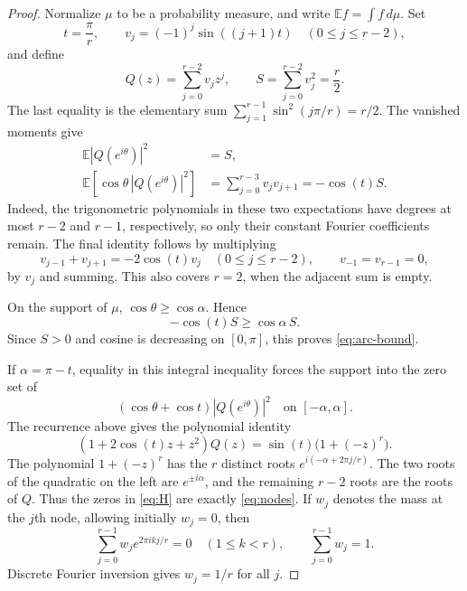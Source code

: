 \documentclass[11pt]{article}
\theoremstyle{definition}
\theoremstyle{remark}
\numberwithin{equation}{section}
\newcommand{\E}{\mathbb E}
\begin{document}
\begin{proof}
Normalize $\mu$ to be a probability measure, and write
$\E f=\int f\,d\mu$. Set
\begin{equation}\label{eq:sine-vector}
 t=\frac\pi r,\qquad
 v_j=(-1)^j\sin((j+1)t)\quad(0\le j\le r-2),
\end{equation}
and define
\begin{equation}\label{eq:Q}
 Q(z)=\sum_{j=0}^{r-2}v_jz^j,\qquad
 S=\sum_{j=0}^{r-2}v_j^2=\frac r2.
\end{equation}
The last equality is the elementary sum
$\sum_{j=1}^{r-1}\sin^2(j\pi/r)=r/2$.
The vanished moments give
\begin{align}
 \E|Q(e^{i\theta})|^2&=S,\label{eq:norm}\\
 \E\!\left[\cos\theta\,|Q(e^{i\theta})|^2\right]
 &=\sum_{j=0}^{r-3}v_jv_{j+1}
 =-\cos(t)S.\label{eq:cosine}
\end{align}
Indeed, the trigonometric polynomials in these two expectations have
degrees at most $r-2$ and $r-1$, respectively, so only their constant
Fourier coefficients remain. The final identity follows by multiplying
\[
 v_{j-1}+v_{j+1}=-2\cos(t)v_j\quad(0\le j\le r-2),
 \qquad v_{-1}=v_{r-1}=0,
\]
by $v_j$ and summing. This also covers $r=2$, when the adjacent sum
is empty.

On the support of $\mu$, $\cos\theta\ge\cos\alpha$. Hence
\[
 -\cos(t)S\ge\cos\alpha\,S.
\]
Since $S>0$ and cosine is decreasing on $[0,\pi]$, this proves
\eqref{eq:arc-bound}.

If $\alpha=\pi-t$, equality in this integral inequality forces the
support into the zero set of
\begin{equation}\label{eq:H}
 (\cos\theta+\cos t)|Q(e^{i\theta})|^2
 \quad\text{on }[-\alpha,\alpha].
\end{equation}
The recurrence above gives the polynomial identity
\begin{equation}\label{eq:Qidentity}
 (1+2\cos(t)z+z^2)Q(z)=\sin(t)\bigl(1+(-z)^r\bigr).
\end{equation}
The polynomial $1+(-z)^r$ has the $r$ distinct roots
$e^{i(-\alpha+2\pi j/r)}$. The two roots of the quadratic on the left
are $e^{\pm i\alpha}$, and the remaining $r-2$ roots are the roots of
$Q$. Thus the zeros in \eqref{eq:H} are exactly \eqref{eq:nodes}.
If $w_j$ denotes the mass at the $j$th node, allowing initially $w_j=0$,
then
\[
 \sum_{j=0}^{r-1}w_je^{2\pi ikj/r}=0\quad(1\le k<r),
 \qquad \sum_{j=0}^{r-1}w_j=1.
\]
Discrete Fourier inversion gives $w_j=1/r$ for all $j$.
\end{proof}
\end{document}

